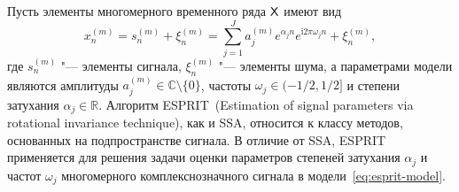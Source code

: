 \documentclass[specialist,
  substylefile=spbu_report.rtx,
subf,href,colorlinks=true, 12pt]{disser}
\theoremstyle{plain}
\theoremstyle{definition}
\theoremstyle{remark}
\newtheorem{remark}{Замечание}[section]
\newcommand{\iu}{\mathrm{i}}
\begin{document}
Пусть элементы многомерного временного ряда $\mathsf{X}$ имеют вид
\begin{equation}
  \label{eq:esprit-model}
  x_n^{(m)} = s_n^{(m)} + \xi_n^{(m)} = \sum_{j=1}^{J} a_j^{(m)} e^{
  \alpha_j n }
  e^{\iu 2 \pi \omega_j n} + \xi_n^{(m)},
\end{equation}
где $s_n^{(m)}$ "--- элементы сигнала, $\xi_n^{(m)}$ "--- элементы
шума, а параметрами модели являются амплитуды
$a_j^{(m)} \in \mathbb{C}\setminus\{0\}$, частоты $\omega_j\in (-1/2,
1/2]$ и степени затухания $\alpha_j \in \mathbb{R}$.
Алгоритм ESPRIT~(Estimation of signal parameters via rotational
invariance tech\-nique),
как и SSA, относится к классу методов, основанных на подпространстве сигнала.
В отличие от SSA, ESPRIT применяется для решения задачи оценки параметров
степеней затухания $\alpha_j$ и частот $\omega_j$ многомерного
комплекснозначного сигнала в модели~\eqref{eq:esprit-model}.
\end{document}
